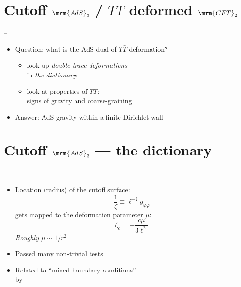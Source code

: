 \documentclass[10pt]{article}
\renewenvironment{frame}[1]%
	{\section*{#1}}%
	{\clearpage}
\newcommand{\pause}{}
\newenvironment{columns}%
	{\par\begin{minipage}{\textwidth}}%
	{\end{minipage}}
\newenvironment{column}[1]%
	{\begin{minipage}{#1}}%
	{\end{minipage}}
\newcommand{\TTbar}{\texorpdfstring{\ensuremath{T\bar{T}}}{TTbar}\xspace}
\begin{document}
\begin{frame}{Cutoff $\mrm{AdS}_3$ / \TTbar deformed $\mrm{CFT}_2$}{%
	\textcite{McGough:2016lol} --
}
\begin{columns}
\figCutoffAds
\hspace{-2em}
\begin{column}{.75\textwidth}
	\begin{itemize}
	\item Question: what is the AdS dual of \TTbar deformation?\\
	
	\begin{itemize}
	\item look up \textit{double-trace deformations}\\
	in \textit{the dictionary}:\\
	\textcite{Heemskerk:2010hk}
	
\pause
	\item look at properties of \TTbar:\\
	signs of gravity and coarse-graining\\
	\textcite{Dubovsky:2012wk,Dubovsky:2013ira}
	\end{itemize}
	
	\pause
	\item Answer: AdS gravity within a finite Dirichlet wall
	
	\end{itemize}
\end{column}
\end{columns}
\end{frame}


\begin{frame}{Cutoff $\mrm{AdS}_3$ --- the dictionary}{%
	\textcite{McGough:2016lol} --
}
\begin{columns}
\figCutoffAds
\hspace{-1em}
\begin{column}{.7\textwidth}
	\begin{itemize}
	\item Location (radius) of the cutoff surface:
	\begin{equation}
		\frac{1}{\zeta} \equiv \ell^{-2} g_{\varphi\varphi} \label{cutoff}
	\end{equation}
	gets mapped to the deformation parameter $\mu$:
	\begin{equation}
		\zeta_c = - \frac{c \mu}{3\ell^2}
		\label{dictionary}
	\end{equation}
	\textit{Roughly $\mu \sim 1/r^2$}
	
\pause
	
	\item Passed many non-trivial tests
	\item Related to ``mixed boundary conditions''\\
	by \textcite{Guica:2019nzm}
	
	\end{itemize}
\end{column}
\end{columns}
\end{frame}
\end{document}
